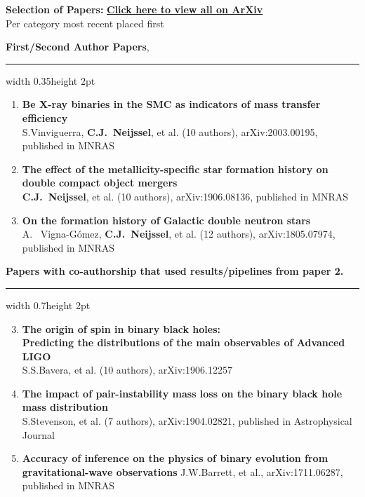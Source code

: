 \documentclass[]{res} %
\begin{document}
{\Large{\textbf{Selection of Papers:} }\textbf{\color{blue} \href{https://arxiv.org/search/?query=Neijssel\%2C+C&searchtype=author&abstracts=show&order=-announced_date_first&size=50}{Click here to view all on ArXiv}}\\}
Per category most recent placed first

{\large \textbf{First/Second Author Papers}, }
{\color{lightgray}\hrule width 0.35\textwidth height 2pt}
\begin{enumerate}

\item \textbf{Be X-ray binaries in the SMC as indicators of mass transfer efficiency }\\
S.Vinviguerra, \textbf{C.J.\ Neijssel}, et al. (10 authors), arXiv:2003.00195, published in MNRAS

\item \textbf{The effect of the metallicity-specific star formation history on double compact object mergers}\\
\textbf{C.J.\ Neijssel}, et al. (10 authors), arXiv:1906.08136, published in MNRAS

\item \textbf{On the formation history of Galactic double neutron stars}\\
A. \ Vigna-G{\'o}mez, \textbf{C.J.\ Neijssel}, et al. (12 authors), arXiv:1805.07974, published in MNRAS
\end{enumerate}

{\large \textbf{Papers with co-authorship that used results/pipelines from paper 2. }} 
{\color{lightgray}\hrule width 0.7\textwidth height 2pt}
\begin{enumerate}
\setcounter{enumi}{2}
\item \textbf{The origin of spin in binary black holes: \\ Predicting the distributions of the main observables of Advanced LIGO}\\
S.S.Bavera, et al. (10 authors), arXiv:1906.12257
\item \textbf{The impact of pair-instability mass loss on the binary black hole mass distribution}\\
S.Stevenson, et al. (7 authors), arXiv:1904.02821, published in Astrophysical Journal
\item \textbf{Accuracy of inference on the physics of binary evolution from gravitational-wave observations}
J.W.Barrett, et al., arXiv:1711.06287, published in MNRAS
\end{enumerate}
\end{document}
